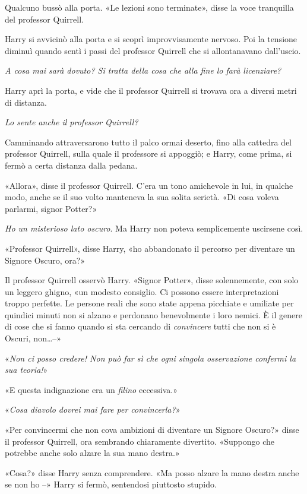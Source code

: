 Qualcuno bussò alla porta. «Le lezioni sono terminate», disse la voce tranquilla del professor Quirrell.

Harry si avvicinò alla porta e si scoprì improvvisamente nervoso. Poi la tensione diminuì quando sentì i passi del professor Quirrell che si allontanavano dall’uscio.

\textit{A cosa mai sarà dovuto? Si tratta della cosa che alla fine lo farà licenziare?}

Harry aprì la porta, e vide che il professor Quirrell si trovava ora a diversi metri di distanza.

\textit{Lo sente anche il professor Quirrell?}

Camminando attraversarono tutto il palco ormai deserto, fino alla cattedra del professor Quirrell, sulla quale il professore si appoggiò; e Harry, come prima, si fermò a certa distanza dalla pedana.

«Allora», disse il professor Quirrell. C’era un tono amichevole in lui, in qualche modo, anche se il suo volto manteneva la sua solita serietà. «Di cosa voleva parlarmi, signor Potter?»

\textit{Ho un misterioso lato oscuro}. Ma Harry non poteva semplicemente uscirsene così.

«Professor Quirrell», disse Harry, «ho abbandonato il percorso per diventare un Signore Oscuro, ora?»

Il professor Quirrell osservò Harry. «Signor Potter», disse solennemente, con solo un leggero ghigno, «un modesto consiglio. Ci possono essere interpretazioni troppo perfette. Le persone reali che sono state appena picchiate e umiliate per quindici minuti non si alzano e perdonano benevolmente i loro nemici. È il genere di cose che si fanno quando si sta cercando di \textit{convincere} tutti che non si è Oscuri, non…–»

«\textit{Non ci posso credere! Non può far sì che ogni singola osservazione confermi la sua teoria!}»

«E questa indignazione era un \textit{filino} eccessiva.»

«\textit{Cosa diavolo dovrei mai fare per convincerla?}»

«Per convincermi che non cova ambizioni di diventare un Signore Oscuro?» disse il professor Quirrell, ora sembrando chiaramente divertito. «Suppongo che potrebbe anche solo alzare la sua mano destra.»

«Cosa?» disse Harry senza comprendere. «Ma posso alzare la mano destra anche se non ho –» Harry si fermò, sentendosi piuttosto stupido.

